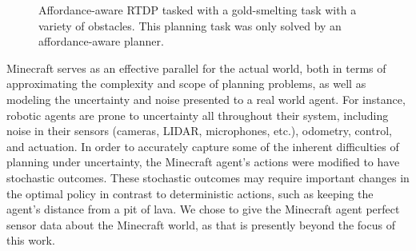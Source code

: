\documentclass[conference]{IEEEtran}
\begin{document}
\begin{figure}
\centering
%
%
%
%
  \caption{Affordance-aware RTDP tasked with a gold-smelting task with a variety of obstacles. This planning task was
  only solved by an affordance-aware planner.}
  \label{fig:epicworld}
\end{figure}

Minecraft serves as an effective parallel for the actual world, both
in terms of approximating the complexity and scope of planning
problems, as well as modeling the uncertainty and noise presented to a
real world agent.  For instance, robotic agents are prone to
uncertainty all throughout their system, including noise in their
sensors (cameras, LIDAR, microphones, etc.), odometry, control, and
actuation.  In order to accurately capture some of the inherent
difficulties of planning under uncertainty, the Minecraft agent's
actions were modified to have stochastic outcomes. These stochastic
outcomes may require important changes in the optimal policy in
contrast to deterministic actions, such as keeping the agent's
distance from a pit of lava. We chose to give the Minecraft agent perfect
sensor data about the Minecraft world, as that is presently beyond the focus of this
work.
\end{document}
